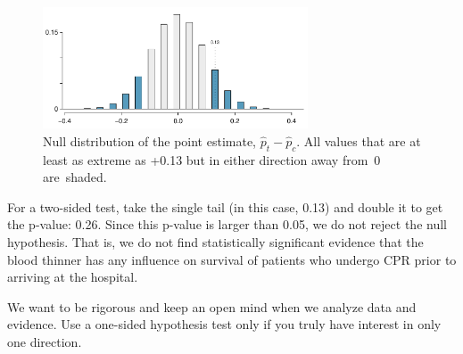 
\begin{figure}[ht]
\centering
\includegraphics[width=0.7\textwidth]{02/figures/CPR_study/CPR_study_p_value}
\caption{Null distribution of the point estimate, $\hat{p}_t - \hat{p}_c$. All values that are at least as extreme as +0.13 but in either direction away from~0 are~shaded.}
\label{CPR_study_p_value}
\end{figure}

For a two-sided test, take the single tail (in this case, 0.13) and double it to get the p-value: 0.26. Since this p-value is larger than 0.05, we do not reject the null hypothesis. That is, we do not find statistically significant evidence that the blood thinner has any influence on survival of patients who undergo CPR prior to arriving at the hospital. %


\begin{termBox}{
We want to be rigorous and keep an open mind when we analyze data and evidence. Use a one-sided hypothesis test only if you truly have interest in only one direction.}
\end{termBox}


